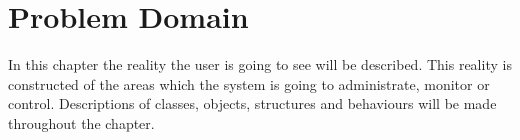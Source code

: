 \chapter{Problem Domain}
In this chapter the reality the user is going to see will be described. This reality is constructed of the areas which the system is going to administrate, monitor or control. Descriptions of classes, objects, structures and behaviours will be made throughout the chapter.




